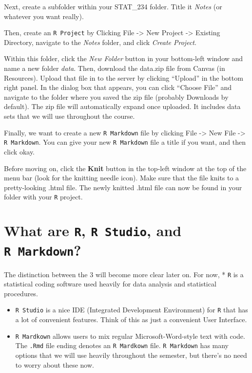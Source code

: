 \documentclass[
]{book}
\begin{document}
Next, create a subfolder within your STAT\_234 folder. Title it \emph{Notes} (or whatever you want really).

Then, create an \texttt{R\ Project} by Clicking File -\textgreater{} New Project -\textgreater{} Existing Directory, navigate to the \emph{Notes} folder, and click \emph{Create Project}.

Within this folder, click the \emph{New Folder} button in your bottom-left window and name a new folder \emph{data}. Then, download the data.zip file from Canvas (in Resources). Upload that file in to the server by clicking ``Upload'' in the bottom right panel. In the dialog box that appears, you can click ``Choose File'' and navigate to the folder where you saved the zip file (probably Downloads by default). The zip file will automatically expand once uploaded. It includes data sets that we will use throughout the course.

Finally, we want to create a new \texttt{R\ Markdown} file by clicking File -\textgreater{} New File -\textgreater{} \texttt{R\ Markdown}. You can give your new \texttt{R\ Markdown} file a title if you want, and then click okay.

Before moving on, click the \textbf{Knit} button in the top-left window at the top of the menu bar (look for the knitting needle icon). Make sure that the file knits to a pretty-looking .html file. The newly knitted .html file can now be found in your folder with your \texttt{R} project.

\hypertarget{what-are-r-r-studio-and-r-markdown}{%
\section{\texorpdfstring{What are \texttt{R}, \texttt{R\ Studio}, and \texttt{R\ Markdown}?}{What are R, R Studio, and R Markdown?}}\label{what-are-r-r-studio-and-r-markdown}}

The distinction between the 3 will become more clear later on. For now,
* \texttt{R} is a statistical coding software used heavily for data analysis and statistical procedures.

\begin{itemize}
\item
  \texttt{R\ Studio} is a nice IDE (Integrated Development Environment) for \texttt{R} that has a lot of convenient features. Think of this as just a convenient User Interface.
\item
  \texttt{R\ Mardkown} allows users to mix regular Microsoft-Word-style text with code. The \texttt{.Rmd} file ending denotes an \texttt{R\ Mardkown} file. \texttt{R\ Markdown} has many options that we will use heavily throughout the semester, but there's no need to worry about these now.
\end{itemize}
\end{document}
